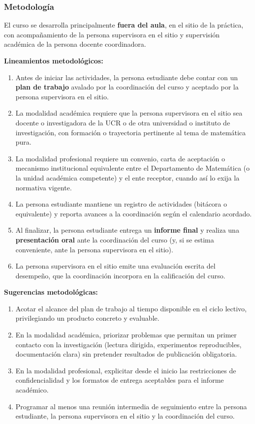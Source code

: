 \begin{refsection}
\subsubsection*{Metodología}

El curso se desarrolla principalmente \textbf{fuera del aula}, en el sitio de la práctica, con acompañamiento de la persona supervisora en el sitio y supervisión académica de la persona docente coordinadora.

\noindent \textbf{Lineamientos metodológicos:}

\begin{enumerate}
    \item Antes de iniciar las actividades, la persona estudiante debe contar con un \textbf{plan de trabajo} avalado por la coordinación del curso y aceptado por la persona supervisora en el sitio.
    \item La modalidad académica requiere que la persona supervisora en el sitio sea docente o investigadora de la UCR o de otra universidad o instituto de investigación, con formación o trayectoria pertinente al tema de matemática pura.
    \item La modalidad profesional requiere un convenio, carta de aceptación o mecanismo institucional equivalente entre el Departamento de Matemática (o la unidad académica competente) y el ente receptor, cuando así lo exija la normativa vigente.
    \item La persona estudiante mantiene un registro de actividades (bitácora o equivalente) y reporta avances a la coordinación según el calendario acordado.
    \item Al finalizar, la persona estudiante entrega un \textbf{informe final} y realiza una \textbf{presentación oral} ante la coordinación del curso (y, si se estima conveniente, ante la persona supervisora en el sitio).
    \item La persona supervisora en el sitio emite una evaluación escrita del desempeño, que la coordinación incorpora en la calificación del curso.
\end{enumerate}

\textbf{Sugerencias metodológicas:}

\begin{enumerate}
    \item Acotar el alcance del plan de trabajo al tiempo disponible en el ciclo lectivo, privilegiando un producto concreto y evaluable.
    \item En la modalidad académica, priorizar problemas que permitan un primer contacto con la investigación (lectura dirigida, experimentos reproducibles, documentación clara) sin pretender resultados de publicación obligatoria.
    \item En la modalidad profesional, explicitar desde el inicio las restricciones de confidencialidad y los formatos de entrega aceptables para el informe académico.
    \item Programar al menos una reunión intermedia de seguimiento entre la persona estudiante, la persona supervisora en el sitio y la coordinación del curso.
\end{enumerate}


\end{refsection}
